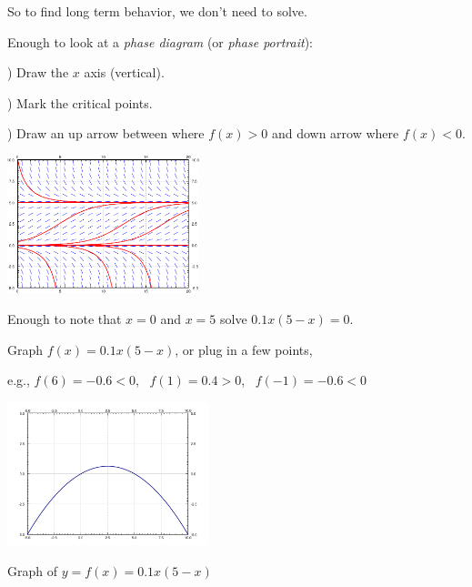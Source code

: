 \documentclass[10pt,aspectratio=169]{beamer}
\begin{document}
\begin{frame}
So to find long term behavior, we don't need to solve.

\medskip
\pause

Enough to look at a \emph{phase diagram} (or \emph{phase portrait}):

) Draw the $x$ axis (vertical).

) Mark the critical points.

) Draw an up arrow between where $f(x) > 0$ and down arrow where $f(x) <
0$.

\bigskip
\pause


\pause
\vspace*{-1.49in}

\hspace*{1in} \includegraphics[width=2.2in]{../figures/2-2-logistic}

\medskip
\pause

Enough to note that $x=0$ and $x=5$ solve $0.1x(5-x)=0$.

\pause
Graph $f(x) = 0.1x(5-x)$,
\pause
or plug in a few points,

\pause
e.g.,
$f(6) = -0.6 < 0$,
\pause 
~$f(1) = 0.4 > 0$,
\pause
~$f(-1) = -0.6 < 0$

\pause
\vspace*{-1.8in}
\hspace*{3.35in}\includegraphics[width=2.3in]{figures/01x5mx}

\hspace*{3.5in} {\small Graph of $y=f(x)=0.1x(5-x)$}

\end{frame}
\end{document}
